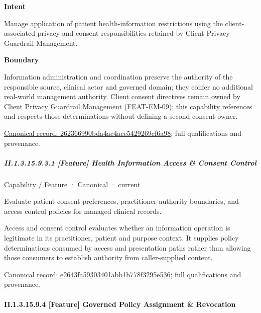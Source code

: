 \textbf{Intent}



Manage application of patient health-information restrictions using the client-associated privacy and consent responsibilities retained by Client Privacy Guardrail Management.



\textbf{Boundary}



Information administration and coordination preserve the authority of the responsible source, clinical actor and governed domain; they confer no additional real-world management authority. Client consent directives remain owned by Client Privacy Guardrail Management (FEAT-EM-09); this capability references and respects those determinations without defining a second consent owner.


{\footnotesize \href{../../../../continuum/strategy/capability/262366990bda4ac4ace5429269cf6a98.md}{Canonical record: 262366990bda4ac4ace5429269cf6a98}; full qualifications and provenance.}\par
\subparagraph*{II.1.3.15.9.3.1 [Feature] Health Information Access \& Consent Control}
\label{navigation:II.1.3.15.9.3.1}

\label{element:e2643fa59303401abb1b778f3295e536}
{\small Capability / Feature · Canonical · current}\par

Evaluate patient consent preferences, practitioner authority boundaries, and access control policies for managed clinical records.



Access and consent control evaluates whether an information operation is legitimate in its practitioner, patient and purpose context. It supplies policy determinations consumed by access and presentation paths rather than allowing those consumers to establish authority from caller-supplied content.


{\footnotesize \href{../../../../continuum/strategy/capability/feature/e2643fa59303401abb1b778f3295e536.md}{Canonical record: e2643fa59303401abb1b778f3295e536}; full qualifications and provenance.}\par
\paragraph*{II.1.3.15.9.4 [Feature] Governed Policy Assignment \& Revocation}
\label{navigation:II.1.3.15.9.4}

